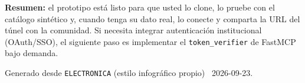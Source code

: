 \documentclass[11pt,a4paper]{article}
\begin{document}
\vspace{10pt}
\begin{tcolorbox}[cajaConcepto]
\textbf{Resumen:} el prototipo est\'a listo para que usted lo clone, lo pruebe con el cat\'alogo
sint\'etico y, cuando tenga su dato real, lo conecte y comparta la URL del túnel con la comunidad.
Si necesita integrar autenticaci\'on institucional (OAuth/SSO), el siguiente paso es implementar el
\texttt{token\_verifier} de FastMCP bajo demanda.
\end{tcolorbox}

\vspace{12pt}
\begin{center}
\footnotesize\color{grisTexto}
Generado desde \texttt{ELECTRONICA} (estilo infogr\'afico propio) \textbullet\ 2026-09-23.
\end{center}
\end{document}
